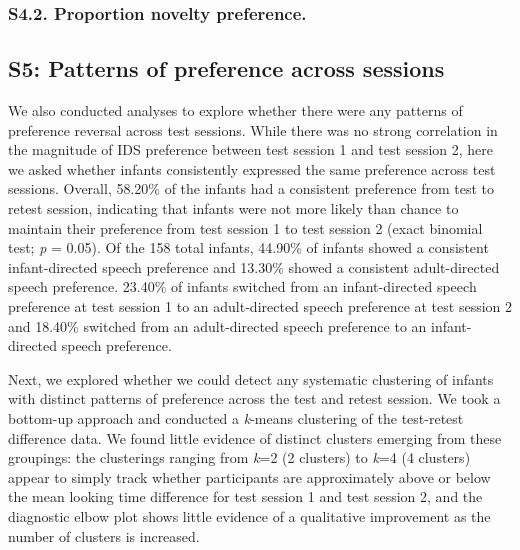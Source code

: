 \documentclass[
  man, donotrepeattitle,floatsintext]{apa6}
\begin{document}
\hypertarget{s4.2.-proportion-novelty-preference.}{%
\subsubsection{S4.2. Proportion novelty preference.}\label{s4.2.-proportion-novelty-preference.}}

\hypertarget{s5-patterns-of-preference-across-sessions}{%
\subsection{S5: Patterns of preference across sessions}\label{s5-patterns-of-preference-across-sessions}}

We also conducted analyses to explore whether there were any patterns of preference reversal across test sessions.
While there was no strong correlation in the magnitude of IDS preference between test session 1 and test session 2, here we asked whether infants consistently expressed the same preference across test sessions.
Overall, 58.20\% of the infants had a consistent preference from test to retest session, indicating that infants were not more likely than chance to maintain their preference from test session 1 to test session 2 (exact binomial test; \emph{p} =
0.05).
Of the 158 total infants, 44.90\% of infants showed a consistent infant-directed speech preference and 13.30\% showed a consistent adult-directed speech preference.
23.40\% of infants switched from an infant-directed speech preference at test session 1 to an adult-directed speech preference at test session 2 and 18.40\% switched from an adult-directed speech preference to an infant-directed speech preference.

Next, we explored whether we could detect any systematic clustering of infants with distinct patterns of preference across the test and retest session.
We took a bottom-up approach and conducted a \emph{k}-means clustering of the test-retest difference data.
We found little evidence of distinct clusters emerging from these groupings: the clusterings ranging from \emph{k}=2 (2 clusters) to \emph{k}=4 (4 clusters) appear to simply track whether participants are approximately above or below the mean looking time difference for test session 1 and test session 2, and the diagnostic elbow plot shows little evidence of a qualitative improvement as the number of clusters is increased.
\end{document}
